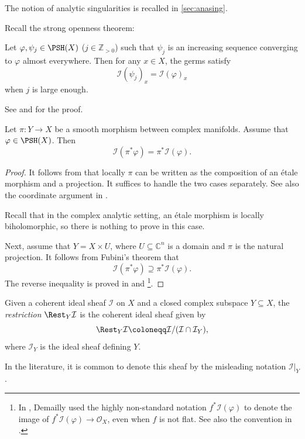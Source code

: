 The notion of analytic singularities is recalled in \cref{sec:anasing}.

Recall the strong openness theorem:
\begin{theorem}\label{thm:strongopen}
    Let $\varphi,\psi_j\in \PSH(X)$ ($j\in \mathbb{Z}_{>0}$) such that $\psi_j$ is an increasing sequence converging to $\varphi$ almost everywhere. Then for any $x\in X$, the germs satisfy
    \[
        \mathcal{I}\left(\psi_j\right)_x=\mathcal{I}(\varphi)_x
    \]
    when $j$ is large enough.
\end{theorem}
See \cite{GZ15, Hiep14} and \cite[Corollary~12.5.4]{FPT} for the proof.

\begin{proposition}\label{prop:pull-backmis}
    Let $\pi\colon Y\rightarrow X$ be a smooth morphism between complex manifolds. Assume that $\varphi\in \PSH(X)$. Then
    \[
    \mathcal{I}(\pi^*\varphi)=\pi^*\mathcal{I}(\varphi).
    \]
\end{proposition}
\begin{proof}
    It follows from \cite[Théorème~3.10]{SHC6} that locally $\pi$ can be written as the composition of an étale morphism and a projection. It suffices to handle the two cases separately. See also the coordinate argument in \cite[Corollary~12.4.2]{FPT}.

    Recall that in the complex analytic setting, an étale morphism is locally biholomorphic, so there is nothing to prove in this case.

    Next, assume that $Y=X\times U$, where $U\subseteq \mathbb{C}^n$ is a domain and $\pi$ is the natural projection. It follows from Fubini's theorem that
    \[
    \mathcal{I}(\pi^*\varphi)\supseteq \pi^*\mathcal{I}(\varphi).
    \]
    The reverse inequality is proved in \cite[Proposition~14.3]{Dem12} and \cite[Corollary~12.4.2]{FPT}\footnote{In \cite[Proposition~14.3]{Dem12}, Demailly used the highly non-standard notation $f^*\mathcal{I}(\varphi)$ to denote the image of $f^*\mathcal{I}(\varphi)\rightarrow \mathcal{O}_X$, even when $f$ is not flat. See also the convention in \cite[Section~B.12]{FPT}.}.
\end{proof}

\begin{definition}\label{def:restidealsheaf}
    Given a coherent ideal sheaf $\mathcal{I}$ on $X$ and a closed complex subspace $Y\subseteq X$, the \emph{restriction}  $\Rest_Y\mathcal{I}$  is the coherent ideal sheaf given by
\begin{equation}\label{eq:RestI}
    \Rest_Y\mathcal{I}\coloneqq \mathcal{I}/(\mathcal{I}\cap \mathcal{I}_Y),
\end{equation}
where $\mathcal{I}_Y$ is the ideal sheaf defining $Y$.
\end{definition}
In the literature, it is common to denote this sheaf by the misleading notation $\mathcal{I}|_Y$.

